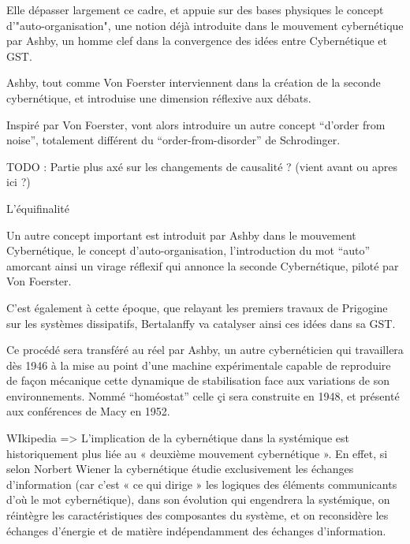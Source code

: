 Elle dépasser largement ce cadre, et appuie sur des bases physiques le concept d'"auto-organisation", une notion déjà introduite dans le mouvement cybernétique par Ashby, un homme clef dans la convergence des idées entre Cybernétique et GST.

Ashby, tout comme Von Foerster interviennent dans la création de la seconde cybernétique, et introduise une dimension réflexive aux débats.

Inspiré par Von Foerster, vont alors introduire un autre concept \enquote{d'order from noise}, totalement différent du \enquote{order-from-disorder} de Schrodinger.

TODO : Partie plus axé sur les changements de causalité ? (vient avant ou apres ici ?)

L'équifinalité

Un autre concept important est introduit par Ashby dans le mouvement Cybernétique, le concept d'auto-organisation, l'introduction du mot \enquote{auto} amorcant ainsi un virage réflexif qui annonce la seconde Cybernétique, piloté par Von Foerster.




C'est également à cette époque, que relayant les premiers travaux de Prigogine sur les systèmes dissipatifs, Bertalanffy va catalyser ainsi ces idées dans sa GST.

Ce procédé sera transféré au réel par Ashby, un autre cybernéticien qui travaillera dès 1946 à la mise au point d'une machine expérimentale capable de reproduire de façon mécanique cette dynamique de stabilisation face aux variations de son environnements. Nommé \enquote{homéostat} celle çi sera construite en 1948, et présenté aux conférences de Macy en 1952.

WIkipedia => L'implication de la cybernétique dans la systémique est historiquement plus liée au « deuxième mouvement cybernétique ». En effet, si selon Norbert Wiener la cybernétique étudie exclusivement les échanges d'information (car c'est « ce qui dirige » les logiques des éléments communicants d'où le mot cybernétique), dans son évolution qui engendrera la systémique, on réintègre les caractéristiques des composantes du système, et on reconsidère les échanges d'énergie et de matière indépendamment des échanges d'information.

